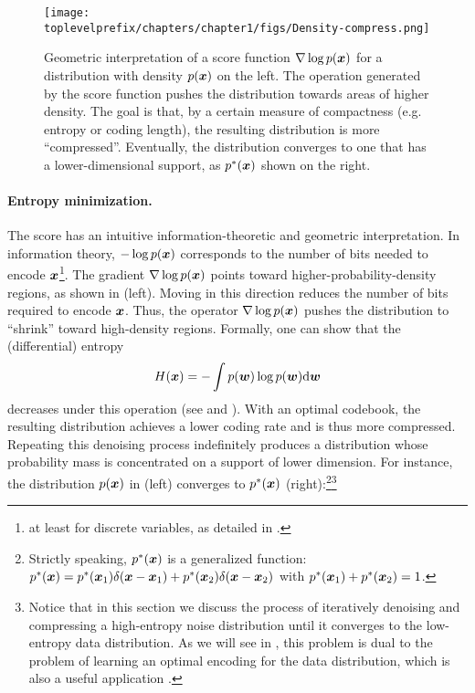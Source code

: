 \documentclass[../../book-main.tex]{subfiles}
\begin{document}
\begin{figure}
    \centering
    \texttt{[image: \\toplevelprefix/chapters/chapter1/figs/Density-compress.png]}
    \caption{Geometric interpretation of a score function $\nabla \log p(\bm{x})$ for a distribution with density $p(\bm{x})$ on the left. The operation generated by the score function pushes the distribution towards areas of higher density. The goal is that, by a certain measure of compactness (e.g. entropy or coding length), the resulting distribution is more ``compressed''. Eventually, the distribution converges to one that has a lower-dimensional support, as $p^*(\bm{x})$ shown on the right.}
    \label{fig:score-function}
\end{figure}

\paragraph{Entropy minimization.} The score has an intuitive information-theoretic and geometric interpretation. In information theory, $-\log p(\bm{x})$ corresponds to the number of bits needed to encode $\bm{x}$\footnote{at least for discrete variables, as detailed in .}. The gradient $\nabla \log p(\bm{x})$ points toward higher-probability-density regions, as shown in  (left). Moving in this direction reduces the number of bits required to encode $\bm{x}$. Thus, the operator $\nabla \log p(\bm{x})$ pushes the distribution to ``shrink'' toward high-density regions. Formally, one can show that the (differential) entropy
\begin{equation}
H(\bm{x}) = - \int p(\boldsymbol{w}) \log p(\boldsymbol{w}) \mathrm{d}\boldsymbol{w}
\end{equation}
decreases under this operation (see  and ). With an optimal codebook, the resulting distribution achieves a lower coding rate and is thus more compressed. Repeating this denoising process indefinitely produces a distribution whose probability mass is concentrated on a support of lower dimension. For instance, the distribution $p(\bm{x})$ in  (left) converges to $p^*(\bm{x})$ (right):\footnote{Strictly speaking, $p^*(\bm{x})$ is a generalized function: $p^*(\bm{x}) = p^*(\bm{x}_1)\delta(\bm{x}-\bm{x}_1) + p^*(\bm{x}_2) \delta(\bm{x}-\bm{x}_2)$ with $p^*(\bm{x}_1) + p^*(\bm{x}_2) = 1$.}\footnote{Notice that in this section we discuss the process of iteratively denoising and compressing a high-entropy noise distribution until it converges to the low-entropy data distribution. As we will see in , this problem is dual to the problem of learning an optimal encoding for the data distribution, which is also a useful application \cite{relic2024lossy}.}
\end{document}
